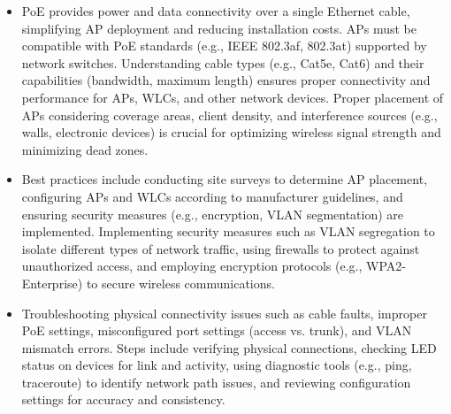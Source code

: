 \documentclass{article}
\begin{document}
\begin{itemize}
	\item[] PoE provides power and data connectivity over a single Ethernet cable, simplifying AP deployment and reducing installation costs. APs must be compatible with PoE standards (e.g., IEEE 802.3af, 802.3at) supported by network switches. Understanding cable types (e.g., Cat5e, Cat6) and their capabilities (bandwidth, maximum length) ensures proper connectivity and performance for APs, WLCs, and other network devices. Proper placement of APs considering coverage areas, client density, and interference sources (e.g., walls, electronic devices) is crucial for optimizing wireless signal strength and minimizing dead zones.
	\item[] Best practices include conducting site surveys to determine AP placement, configuring APs and WLCs according to manufacturer guidelines, and ensuring security measures (e.g., encryption, VLAN segmentation) are implemented. Implementing security measures such as VLAN segregation to isolate different types of network traffic, using firewalls to protect against unauthorized access, and employing encryption protocols (e.g., WPA2-Enterprise) to secure wireless communications.
	\item[] Troubleshooting physical connectivity issues such as cable faults, improper PoE settings, misconfigured port settings (access vs. trunk), and VLAN mismatch errors. Steps include verifying physical connections, checking LED status on devices for link and activity, using diagnostic tools (e.g., ping, traceroute) to identify network path issues, and reviewing configuration settings for accuracy and consistency.
  

\end{itemize}
\end{document}
